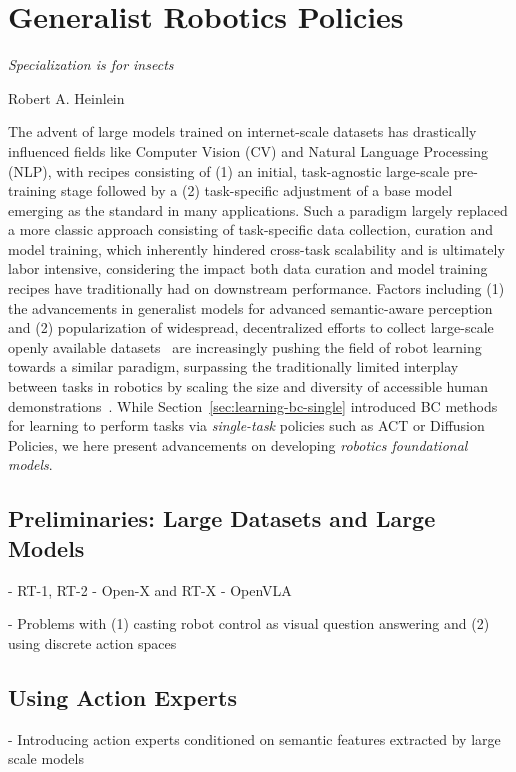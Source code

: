 \section{Generalist Robotics Policies}
\label{sec:learning-bc-generalist}

\epigraph{\textit{Specialization is for insects}}{Robert A. Heinlein}

The advent of large models trained on internet-scale datasets has drastically influenced fields like Computer Vision (CV) and Natural Language Processing (NLP), with recipes consisting of (1) an initial, task-agnostic large-scale pre-training stage followed by a (2) task-specific adjustment of a base model emerging as the standard in many applications.
Such a paradigm largely replaced a more classic approach consisting of task-specific data collection, curation and model training, which inherently hindered cross-task scalability and is ultimately labor intensive, considering the impact both data curation and model training recipes have traditionally had on downstream performance.
Factors including (1) the advancements in generalist models for advanced semantic-aware perception~\citep{oquabDINOv2LearningRobust2024} and (2) popularization of widespread, decentralized efforts to collect large-scale openly available datasets~\citep{OpenXEmbodimentRobotic,DROIDLargeScaleIntheWild} are increasingly pushing the field of robot learning towards a similar paradigm, surpassing the traditionally limited interplay between tasks in robotics by scaling the size and diversity of accessible human demonstrations~\citet{brohanRT1RoboticsTransformer2023}.
While Section~\ref{sec:learning-bc-single} introduced BC methods for learning to perform tasks via \emph{single-task} policies such as ACT or Diffusion Policies, we here present advancements on developing \emph{robotics foundational models}. 

\subsection{Preliminaries: Large Datasets and Large Models}


- RT-1, RT-2
- Open-X and RT-X
- OpenVLA

- Problems with (1) casting robot control as visual question answering and (2) using discrete action spaces

\subsection{Using Action Experts}
- Introducing action experts conditioned on semantic features extracted by large scale models

